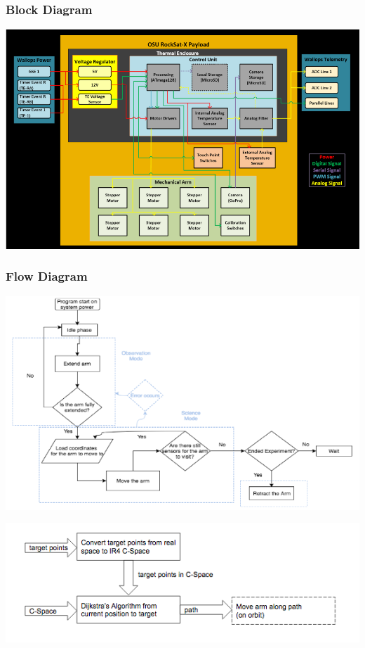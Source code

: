 \subsubsection{Block Diagram}
\includegraphics[width=\textwidth]{./images/ProjectDocs/functionalBlockDiagram}

\subsubsection{Flow Diagram}
\includegraphics[width=\textwidth]{./images/ProjectDocs/flowDiagram}

\includegraphics[width=\textwidth]{./images/ProjectDocs/pathingAndAutomationFlow}

